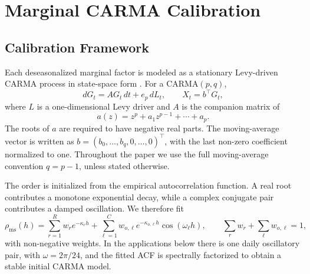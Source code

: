 \section{Marginal CARMA Calibration}\label{sec:marginal-carma-calibration}

\subsection{Calibration Framework}\label{ssec:carma-calibration-framework}

Each deseasonalized marginal factor is modeled as a stationary Levy-driven
CARMA process in state-space form \citep{BrockwellLindner2024Ch18}. For a
CARMA\((p,q)\),
\begin{equation}
  dG_t=A G_t\,dt+e_p\,dL_t,
  \qquad
  X_t=b^\top G_t ,
  \label{eq:carma-state-space}
\end{equation}
where \(L\) is a one-dimensional Levy driver and \(A\) is the companion matrix
of
\begin{equation}
  a(z)=z^p+a_1z^{p-1}+\cdots+a_p .
  \label{eq:carma-ar-polynomial}
\end{equation}
The roots of \(a\) are required to have negative real parts. The moving-average
vector is written as \(b=(b_0,\ldots,b_q,0,\ldots,0)^\top\), with the last
non-zero coefficient normalized to one. Throughout the paper we use the full
moving-average convention \(q=p-1\), unless stated otherwise.

The order is initialized from the empirical autocorrelation function. A real
root contributes a monotone exponential decay, while a complex conjugate pair
contributes a damped oscillation. We therefore fit
\begin{equation}
  \rho_{\mathrm{ms}}(h)
  =
  \sum_{r=1}^{R} w_r e^{-\kappa_r h}
  +
  \sum_{\ell=1}^{C} w_{o,\ell} e^{-\kappa_{o,\ell}h}
  \cos(\omega_\ell h),
  \qquad
  \sum_r w_r+\sum_\ell w_{o,\ell}=1 ,
  \label{eq:carma-multiscale-acf}
\end{equation}
with non-negative weights. In the applications below there is one daily
oscillatory pair, with \(\omega=2\pi/24\), and the fitted ACF is spectrally
factorized to obtain a stable initial CARMA model.

